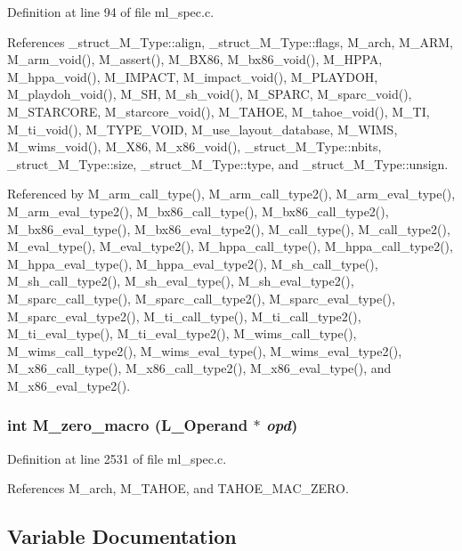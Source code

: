 Definition at line 94 of file ml\_\-spec.c.

References \_\-struct\_\-M\_\-Type::align, \_\-struct\_\-M\_\-Type::flags, M\_\-arch, M\_\-ARM, M\_\-arm\_\-void(), M\_\-assert(), M\_\-BX86, M\_\-bx86\_\-void(), M\_\-HPPA, M\_\-hppa\_\-void(), M\_\-IMPACT, M\_\-impact\_\-void(), M\_\-PLAYDOH, M\_\-playdoh\_\-void(), M\_\-SH, M\_\-sh\_\-void(), M\_\-SPARC, M\_\-sparc\_\-void(), M\_\-STARCORE, M\_\-starcore\_\-void(), M\_\-TAHOE, M\_\-tahoe\_\-void(), M\_\-TI, M\_\-ti\_\-void(), M\_\-TYPE\_\-VOID, M\_\-use\_\-layout\_\-database, M\_\-WIMS, M\_\-wims\_\-void(), M\_\-X86, M\_\-x86\_\-void(), \_\-struct\_\-M\_\-Type::nbits, \_\-struct\_\-M\_\-Type::size, \_\-struct\_\-M\_\-Type::type, and \_\-struct\_\-M\_\-Type::unsign.

Referenced by M\_\-arm\_\-call\_\-type(), M\_\-arm\_\-call\_\-type2(), M\_\-arm\_\-eval\_\-type(), M\_\-arm\_\-eval\_\-type2(), M\_\-bx86\_\-call\_\-type(), M\_\-bx86\_\-call\_\-type2(), M\_\-bx86\_\-eval\_\-type(), M\_\-bx86\_\-eval\_\-type2(), M\_\-call\_\-type(), M\_\-call\_\-type2(), M\_\-eval\_\-type(), M\_\-eval\_\-type2(), M\_\-hppa\_\-call\_\-type(), M\_\-hppa\_\-call\_\-type2(), M\_\-hppa\_\-eval\_\-type(), M\_\-hppa\_\-eval\_\-type2(), M\_\-sh\_\-call\_\-type(), M\_\-sh\_\-call\_\-type2(), M\_\-sh\_\-eval\_\-type(), M\_\-sh\_\-eval\_\-type2(), M\_\-sparc\_\-call\_\-type(), M\_\-sparc\_\-call\_\-type2(), M\_\-sparc\_\-eval\_\-type(), M\_\-sparc\_\-eval\_\-type2(), M\_\-ti\_\-call\_\-type(), M\_\-ti\_\-call\_\-type2(), M\_\-ti\_\-eval\_\-type(), M\_\-ti\_\-eval\_\-type2(), M\_\-wims\_\-call\_\-type(), M\_\-wims\_\-call\_\-type2(), M\_\-wims\_\-eval\_\-type(), M\_\-wims\_\-eval\_\-type2(), M\_\-x86\_\-call\_\-type(), M\_\-x86\_\-call\_\-type2(), M\_\-x86\_\-eval\_\-type(), and M\_\-x86\_\-eval\_\-type2().
\subsubsection{\setlength{\rightskip}{0pt plus 5cm}int M\_\-zero\_\-macro (L\_\-Operand $\ast$ {\em opd})}\label{ml__spec_8c_f718c396d2c4b99bddea75fc51c722e0}




Definition at line 2531 of file ml\_\-spec.c.

References M\_\-arch, M\_\-TAHOE, and TAHOE\_\-MAC\_\-ZERO.

\subsection{Variable Documentation}
